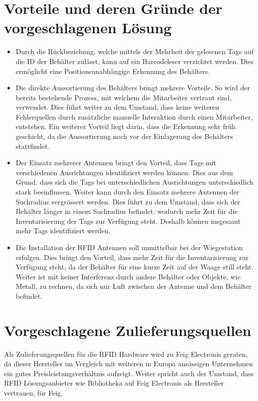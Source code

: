 \section{Vorteile und deren Gründe der vorgeschlagenen Lösung}
\begin{itemize}
	\item Durch die Rückbeziehung, welche mittels der Mehrheit der gelesenen Tags auf die ID der Behälter zulässt, kann auf ein Barcodeleser verzichtet werden. Dies ermöglicht eine Positionsunabhängige Erkennung des Behälters.
	\item Die direkte Aussortierung des Behälters bringt mehrere Vorteile. So wird der bereits bestehende Prozess, mit welchem die Mitarbeiter vertraut sind, verwendet. Dies führt weiter zu dem Umstand, dass keine weiteren Fehlerquellen durch zusätzliche manuelle Interaktion durch einen Mitarbeiter, entstehen. Ein weiterer Vorteil liegt darin, dass die Erkennung sehr früh geschieht, da die Aussortierung noch vor der Einlagerung des Behälters stattfindet.
	\item Der Einsatz mehrerer Antennen bringt den Vorteil, dass Tags mit verschiedenen Ausrichtungen identifiziert werden können. Dies aus dem Grund, dass sich die Tags bei unterschiedlichen Ausrichtungen unterschiedlich stark beeinflussen. Weiter kann durch den Einsatz mehrere Antennen der Suchradius vergrössert werden. Dies führt zu dem Umstand, dass sich der Behälter länger in einem Suchradius befindet, wodurch mehr Zeit für die Inventarisierung der Tags zur Verfügung steht. Deshalb können insgesamt mehr Tags identifiziert werden.
	\item Die Installation der RFID Antennen soll unmittelbar bei der Wiegestation erfolgen. Dies bringt den Vorteil, dass mehr Zeit für die Inventarisierung zur Verfügung steht, da der Behälter für eine kurze Zeit auf der Waage still steht. Weiter ist mit keiner Interferenz durch andere Behälter oder Objekte, wie Metall, zu rechnen, da sich nur Luft zwischen der Antenne und dem Behälter befindet.
\end{itemize}


\section{Vorgeschlagene Zulieferungsquellen}
Als Zulieferungsquellen für die RFID Hardware wird zu Feig Electronis geraten, da dieser Hersteller im Vergleich mit weiteren in Europa ansässigen Unternehmen ein gutes Preisleistungsverhältnis aufzeigt. Weiter spricht auch der Umstand, dass RFID Lösungsanbieter wie Bibliotheka auf Feig Electronis als Hersteller vertrauen, für Feig.

